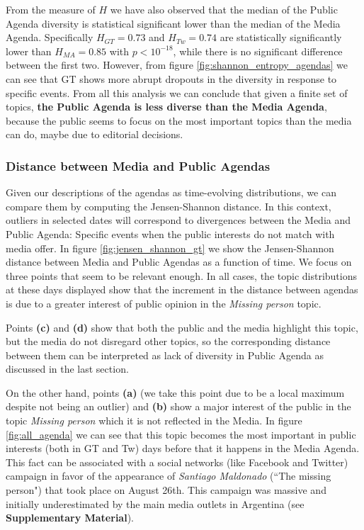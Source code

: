 \documentclass{bmcart}
\begin{document}
\par From the measure of $H$ we have also observed that the median of the Public Agenda diversity is statistical significant lower than the median of the Media Agenda.
Specifically $H_{GT} = 0.73$ and $H_{Tw} = 0.74$ are statistically significantly lower than $H_{MA} = 0.85$ with $p < 10^{-18}$, while there is no significant difference between the first two. 
However, from figure \ref{fig:shannon_entropy_agendas} we can see that GT shows more abrupt dropouts in the diversity in response to specific events.
From all this analysis we  can conclude that given a finite set of topics, \textbf{the Public Agenda is less diverse than the Media Agenda}, because the public seems to focus on the most important topics than the media can do, maybe due to editorial decisions.

\subsubsection*{Distance between Media and Public Agendas}

\par Given our descriptions of the agendas as time-evolving distributions, we can  compare them by computing the Jensen-Shannon distance. In this context, outliers in selected dates will correspond to divergences between the Media and Public Agenda: Specific events when the public interests do not match with media offer.
In figure \ref{fig:jensen_shannon_gt} we show the Jensen-Shannon distance between Media and Public Agendas as a function of time. We focus on three points that seem to be relevant enough. In all cases, the topic distributions at these days displayed show that the increment in the distance between agendas is due to a greater interest of public opinion in the \emph{Missing person} topic. 

\par Points \textbf{(c)} and \textbf{(d)} show that both the public and the media highlight this topic, but the media do not disregard other topics, so the corresponding distance between them can be interpreted as lack of diversity in Public Agenda as discussed in the last section.

\par On the other hand,  points \textbf{(a)} (we take this point due to be a local maximum despite not being an outlier) and \textbf{(b)}  show a major  interest of the public in the topic \emph{Missing person} which it is not reflected in the Media.  
In figure \ref{fig:all_agenda} we can see that this topic becomes the most important in public interests (both in GT and Tw) days before that it happens in the Media Agenda. This fact can be associated  with a social networks (like Facebook and Twitter) campaign  in favor  of the appearance of \emph{Santiago Maldonado} (``The missing person") that took place on  August 26th. This campaign was massive and  initially underestimated by the main media outlets in Argentina (see \textbf{Supplementary Material}). 
\end{document}
